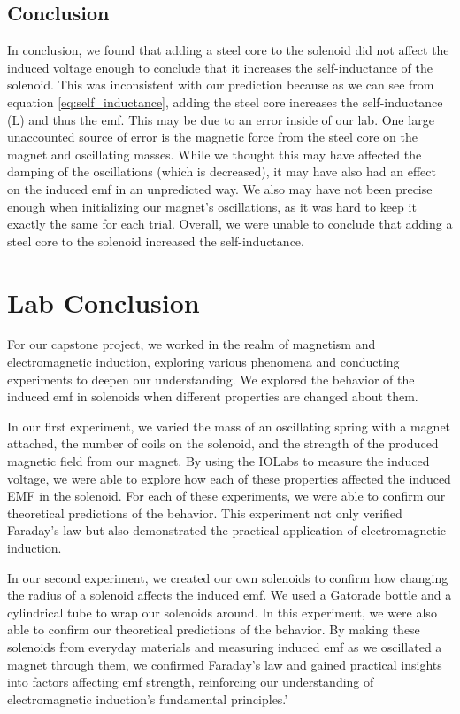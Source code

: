 \documentclass[11pt]{article}
\let\oldsection\section
\renewcommand\section{\clearpage\oldsection}
\begin{document}
    \subsection{Conclusion}\label{subsec:part_3_conclusion}
    In conclusion, we found that adding a steel core to the solenoid did not affect the induced voltage enough to conclude that it increases the self-inductance of the solenoid. This was inconsistent with our prediction because as we can see from equation \ref{eq:self_inductance}, adding the steel core increases the self-inductance (L) and thus the emf. This may be due to an error inside of our lab. One large unaccounted source of error is the magnetic force from the steel core on the magnet and oscillating masses. While we thought this may have affected the damping of the oscillations (which is decreased), it may have also had an effect on the induced emf in an unpredicted way. We also may have not been precise enough when initializing our magnet's oscillations, as it was hard to keep it exactly the same for each trial. Overall, we were unable to conclude that adding a steel core to the solenoid increased the self-inductance.

    \section{Lab Conclusion}\label{sec:lab_conclusion}
    For our capstone project, we worked in the realm of magnetism and electromagnetic induction, exploring various phenomena and conducting experiments to deepen our understanding. We explored the behavior of the induced emf in solenoids when different properties are changed about them.

    In our first experiment, we varied the mass of an oscillating spring with a magnet attached, the number of coils on the solenoid, and the strength of the produced magnetic field from our magnet. By using the IOLabs to measure the induced voltage, we were able to explore how each of these properties affected the induced EMF in the solenoid. For each of these experiments, we were able to confirm our theoretical predictions of the behavior. This experiment not only verified Faraday’s law but also demonstrated the practical application of electromagnetic induction.

    In our second experiment, we created our own solenoids to confirm how changing the radius of a solenoid affects the induced emf. We used a Gatorade bottle and a cylindrical tube to wrap our solenoids around. In this experiment, we were also able to confirm our theoretical predictions of the behavior. By making these solenoids from everyday materials and measuring induced emf as we oscillated a magnet through them, we confirmed Faraday's law and gained practical insights into factors affecting emf strength, reinforcing our understanding of electromagnetic induction's fundamental principles.'
\end{document}
